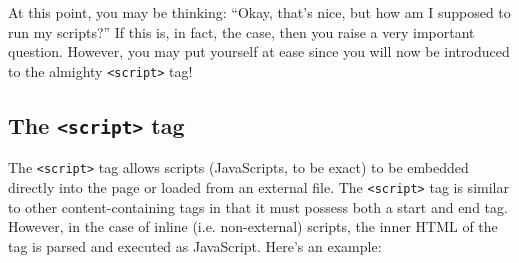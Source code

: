 \documentclass[12pt]{article}
\begin{document}
\par
At this point, you may be thinking: ``Okay, that's nice, but how am I supposed to run my scripts?'' If this is, in fact, the case, then you raise a very important question. However, you may put yourself at ease since you will now be introduced to the almighty \texttt{<script>} tag!


\subsection{The \texttt{<script>} tag}
The \texttt{<script>} tag allows scripts (JavaScripts, to be exact) to be embedded directly into the page or loaded from an external file. The \texttt{<script>} tag is similar to other content-containing tags in that it must possess both a start and end tag. However, in the case of inline (i.e. non-external) scripts, the inner HTML of the tag is parsed and executed as JavaScript. Here's an example:
\end{document}
